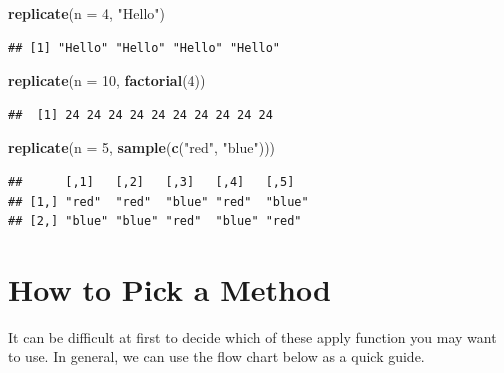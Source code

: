 \documentclass[
]{book}
\newenvironment{Shaded}{\begin{snugshade}}{\end{snugshade}}
\newcommand{\DataTypeTok}[1]{\textcolor[rgb]{0.13,0.29,0.53}{#1}}
\newcommand{\DecValTok}[1]{\textcolor[rgb]{0.00,0.00,0.81}{#1}}
\newcommand{\KeywordTok}[1]{\textcolor[rgb]{0.13,0.29,0.53}{\textbf{#1}}}
\newcommand{\NormalTok}[1]{#1}
\newcommand{\StringTok}[1]{\textcolor[rgb]{0.31,0.60,0.02}{#1}}
\begin{document}
\begin{Shaded}
\begin{Highlighting}[]
\KeywordTok{replicate}\NormalTok{(}\DataTypeTok{n =} \DecValTok{4}\NormalTok{, }\StringTok{"Hello"}\NormalTok{)}
\end{Highlighting}
\end{Shaded}

\begin{verbatim}
## [1] "Hello" "Hello" "Hello" "Hello"
\end{verbatim}

\begin{Shaded}
\begin{Highlighting}[]
\KeywordTok{replicate}\NormalTok{(}\DataTypeTok{n =} \DecValTok{10}\NormalTok{, }\KeywordTok{factorial}\NormalTok{(}\DecValTok{4}\NormalTok{))}
\end{Highlighting}
\end{Shaded}

\begin{verbatim}
##  [1] 24 24 24 24 24 24 24 24 24 24
\end{verbatim}

\begin{Shaded}
\begin{Highlighting}[]
\KeywordTok{replicate}\NormalTok{(}\DataTypeTok{n =} \DecValTok{5}\NormalTok{, }\KeywordTok{sample}\NormalTok{(}\KeywordTok{c}\NormalTok{(}\StringTok{"red"}\NormalTok{, }\StringTok{"blue"}\NormalTok{)))}
\end{Highlighting}
\end{Shaded}

\begin{verbatim}
##      [,1]   [,2]   [,3]   [,4]   [,5]  
## [1,] "red"  "red"  "blue" "red"  "blue"
## [2,] "blue" "blue" "red"  "blue" "red"
\end{verbatim}

\hypertarget{how-to-pick-a-method}{%
\section{How to Pick a Method}\label{how-to-pick-a-method}}

It can be difficult at first to decide which of these apply function you may want to use. In general, we can use the flow chart below as a quick guide.
\end{document}
